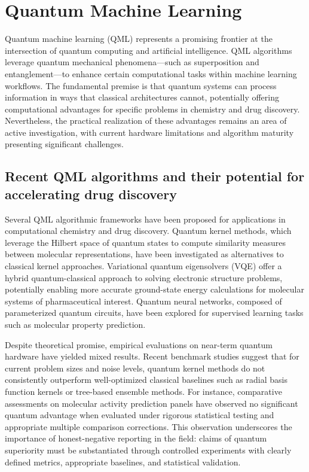 \section{Quantum Machine Learning}

Quantum machine learning (QML) represents a promising frontier at the intersection of quantum computing and artificial intelligence. QML algorithms leverage quantum mechanical phenomena—such as superposition and entanglement—to enhance certain computational tasks within machine learning workflows. The fundamental premise is that quantum systems can process information in ways that classical architectures cannot, potentially offering computational advantages for specific problems in chemistry and drug discovery. Nevertheless, the practical realization of these advantages remains an area of active investigation, with current hardware limitations and algorithm maturity presenting significant challenges.

\subsection{Recent QML algorithms and their potential for accelerating drug discovery}

Several QML algorithmic frameworks have been proposed for applications in computational chemistry and drug discovery. Quantum kernel methods, which leverage the Hilbert space of quantum states to compute similarity measures between molecular representations, have been investigated as alternatives to classical kernel approaches. Variational quantum eigensolvers (VQE) offer a hybrid quantum-classical approach to solving electronic structure problems, potentially enabling more accurate ground-state energy calculations for molecular systems of pharmaceutical interest. Quantum neural networks, composed of parameterized quantum circuits, have been explored for supervised learning tasks such as molecular property prediction.

Despite theoretical promise, empirical evaluations on near-term quantum hardware have yielded mixed results. Recent benchmark studies suggest that for current problem sizes and noise levels, quantum kernel methods do not consistently outperform well-optimized classical baselines such as radial basis function kernels or tree-based ensemble methods. For instance, comparative assessments on molecular activity prediction panels have observed no significant quantum advantage when evaluated under rigorous statistical testing and appropriate multiple comparison corrections. This observation underscores the importance of honest-negative reporting in the field: claims of quantum superiority must be substantiated through controlled experiments with clearly defined metrics, appropriate baselines, and statistical validation.

